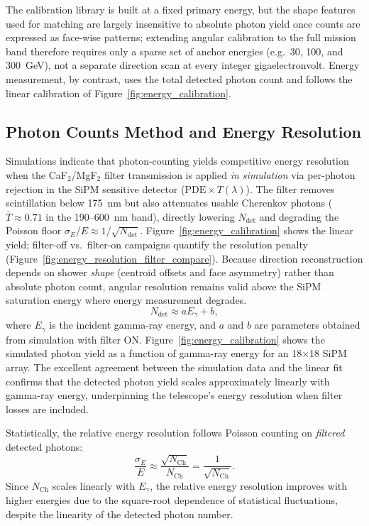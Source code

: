 \documentclass{aastex701}
\begin{document}
The calibration library is built at a fixed primary energy, but the shape features used for matching are largely insensitive to absolute photon yield once counts are expressed as face-wise patterns; extending angular calibration to the full mission band therefore requires only a sparse set of anchor energies (e.g.\ 30, 100, and 300~GeV), not a separate direction scan at every integer gigaelectronvolt. Energy measurement, by contrast, uses the total detected photon count and follows the linear calibration of Figure~\ref{fig:energy_calibration}.

\subsection{Photon Counts Method and Energy Resolution}

Simulations indicate that photon-counting yields competitive energy resolution when the CaF$_2$/MgF$_2$ filter transmission is applied \emph{in simulation} via per-photon rejection in the SiPM sensitive detector ($\mathrm{PDE}\times T(\lambda)$). The filter removes scintillation below 175~nm but also attenuates usable Cherenkov photons ($\bar{T}\approx 0.71$ in the 190--600~nm band), directly lowering $N_\mathrm{det}$ and degrading the Poisson floor $\sigma_E/E \approx 1/\sqrt{N_\mathrm{det}}$. Figure~\ref{fig:energy_calibration} shows the linear yield; filter-off vs.\ filter-on campaigns quantify the resolution penalty (Figure~\ref{fig:energy_resolution_filter_compare}). Because direction reconstruction depends on shower \emph{shape} (centroid offsets and face asymmetry) rather than absolute photon count, angular resolution remains valid above the SiPM saturation energy where energy measurement degrades.
\begin{equation}
N_\mathrm{det} \approx a E_\gamma + b,
\end{equation}
where $E_\gamma$ is the incident gamma-ray energy, and $a$ and $b$ are parameters obtained from simulation with filter ON. Figure~\ref{fig:energy_calibration} shows the simulated photon yield as a function of gamma-ray energy for an 18$\times$18 SiPM array. The excellent agreement between the simulation data and the linear fit confirms that the detected photon yield scales approximately linearly with gamma-ray energy, underpinning the telescope’s energy resolution when filter losses are included.

Statistically, the relative energy resolution follows Poisson counting on \emph{filtered} detected photons:
\begin{equation}
\frac{\sigma_E}{E} \approx \frac{\sqrt{N_\mathrm{Ch}}}{N_\mathrm{Ch}} = \frac{1}{\sqrt{N_\mathrm{Ch}}}.
\end{equation}
Since $N_\mathrm{Ch}$ scales linearly with $E_\gamma$, the relative energy resolution improves with higher energies due to the square-root dependence of statistical fluctuations, despite the linearity of the detected photon number. 
\end{document}
